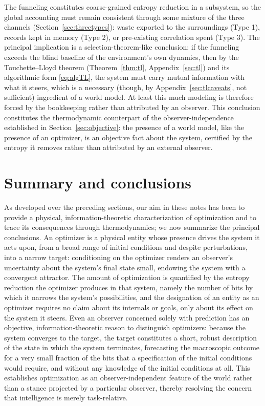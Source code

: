 \documentclass[11pt]{article}
\begin{document}
The funneling constitutes coarse-grained entropy reduction in a subsystem, so the global accounting must remain consistent through some mixture of the three channels (Section~\ref{sec:threetypes}): waste exported to the surroundings (Type 1), records kept in memory (Type 2), or pre-existing correlation spent (Type 3). The principal implication is a selection-theorem-like conclusion: if the funneling exceeds the blind baseline of the environment's own dynamics, then by the Touchette--Lloyd theorem (Theorem~\ref{thm:tl}, Appendix~\ref{sec:tl}) and its algorithmic form \eqref{eq:algTL}, the system must carry mutual information with what it steers, which is a necessary (though, by Appendix~\ref{sec:tlcaveats}, not sufficient) ingredient of a world model. At least this much modeling is therefore forced by the bookkeeping rather than attributed by an observer. This conclusion constitutes the thermodynamic counterpart of the observer-independence established in Section~\ref{sec:objective}: the presence of a world model, like the presence of an optimizer, is an objective fact about the system, certified by the entropy it removes rather than attributed by an external observer.
\section{Summary and conclusions}
\label{sec:takeaways}

As developed over the preceding sections, our aim in these notes has been to provide a physical, information-theoretic characterization of optimization and to trace its consequences through thermodynamics; we now summarize the principal conclusions. An optimizer is a physical entity whose presence drives the system it acts upon, from a broad range of initial conditions and despite perturbations, into a narrow target: conditioning on the optimizer renders an observer's uncertainty about the system's final state small, endowing the system with a convergent attractor. The amount of optimization is quantified by the entropy reduction the optimizer produces in that system, namely the number of bits by which it narrows the system's possibilities, and the designation of an entity as an optimizer requires no claim about its internals or goals, only about its effect on the system it steers. Even an observer concerned solely with prediction has an objective, information-theoretic reason to distinguish optimizers: because the system converges to the target, the target constitutes a short, robust description of the state in which the system terminates, forecasting the macroscopic outcome for a very small fraction of the bits that a specification of the initial conditions would require, and without any knowledge of the initial conditions at all. This establishes optimization as an observer-independent feature of the world rather than a stance projected by a particular observer, thereby resolving the concern that intelligence is merely task-relative.
\end{document}
